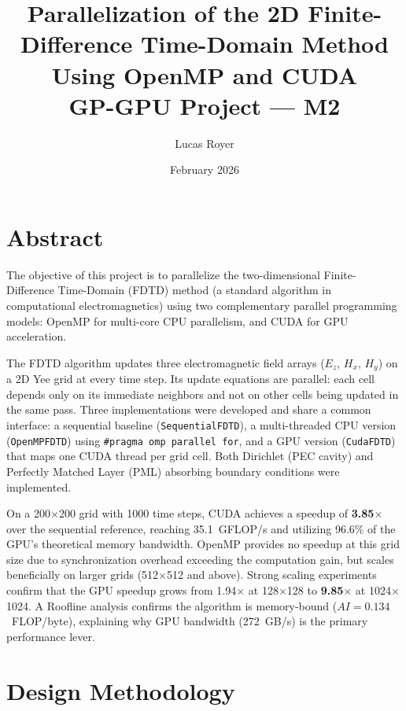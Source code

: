 \documentclass[12pt,a4paper]{article}
\title{
    \vspace{-1cm}
    \Large\textbf{Parallelization of the 2D Finite-Difference Time-Domain Method}\\[0.4em]
    \large Using OpenMP and CUDA\\[1em]
    \normalsize GP-GPU Project — M2
}
\author{Lucas Royer}
\date{February 2026}
\begin{document}
\maketitle
\tableofcontents
\newpage

\section*{Abstract}

The objective of this project is to parallelize the two-dimensional
Finite-Difference Time-Domain (FDTD) method (a standard algorithm
in computational electromagnetics) using two complementary
parallel programming models: OpenMP for multi-core CPU parallelism,
and CUDA for GPU acceleration.

The FDTD algorithm updates three electromagnetic field arrays
($E_z$, $H_x$, $H_y$) on a 2D Yee grid at every time step.
Its update equations are parallel: each cell depends
only on its immediate neighbors and not on other cells being updated
in the same pass.
Three implementations were developed and share a common interface:
a sequential baseline (\texttt{SequentialFDTD}), a multi-threaded
CPU version (\texttt{OpenMPFDTD}) using \texttt{\#pragma omp parallel for},
and a GPU version (\texttt{CudaFDTD}) that maps one CUDA thread
per grid cell.
Both Dirichlet (PEC cavity) and Perfectly Matched Layer (PML)
absorbing boundary conditions were implemented.

On a 200$\times$200 grid with 1000 time steps,
CUDA achieves a speedup of \textbf{3.85$\times$} over the sequential
reference, reaching 35.1~GFLOP/s and utilizing 96.6\% of the GPU's
theoretical memory bandwidth.
OpenMP provides no speedup at this grid size due to synchronization
overhead exceeding the computation gain, but scales beneficially on
larger grids (512$\times$512 and above).
Strong scaling experiments confirm that the GPU speedup grows from
1.94$\times$ at 128$\times$128 to \textbf{9.85$\times$} at
1024$\times$1024.
A Roofline analysis confirms the algorithm is memory-bound
($AI = 0.134$~FLOP/byte), explaining why GPU bandwidth
(272~GB/s) is the primary performance lever.

\section{Design Methodology}
\end{document}
